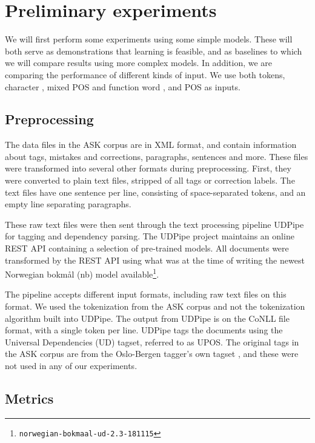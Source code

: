 \chapter{Preliminary experiments}

We will first perform some experiments using some simple models. These will
both serve as demonstrations that learning is feasible, and as baselines to
which we will compare results using more complex models. In addition, we are
comparing the performance of different kinds of input. We use both tokens,
character \ngrams, mixed POS and function word \ngrams, and \ac{POS} \ngrams
as inputs.


\section{Preprocessing}

The data files in the ASK corpus are in \ac{XML} format, and contain
information about tags, mistakes and corrections, paragraphs, sentences and
more. These files were transformed into several other formats during
preprocessing. First, they were converted to plain text files, stripped of
all tags or correction labels. The text files have one sentence per line,
consisting of space-separated tokens, and an empty line separating
paragraphs.

These raw text files were then sent through the text processing pipeline
UDPipe \autocite{udpipe:2017} for tagging and dependency parsing. The UDPipe
project maintains an online REST \ac{API} containing a selection of
pre-trained models. All documents were transformed by the REST \ac{API} using
what was at the time of writing the newest Norwegian bokmål (nb) model
available\footnote{\texttt{norwegian-bokmaal-ud-2.3-181115}}.

The pipeline accepts different input formats, including raw text files on
this format. We used the tokenization from the ASK corpus and not the
tokenization algorithm built into UDPipe. The output from UDPipe is on the
CoNLL file format, with a single token per line. UDPipe tags the documents
using the Universal Dependencies (UD) tagset, referred to as UPOS. The
original tags in the ASK corpus are from the Oslo-Bergen tagger's own tagset
\autocite{oslobergen}, and these were not used in any of our experiments.


\section{Metrics}
\label{metrics-discussion}

